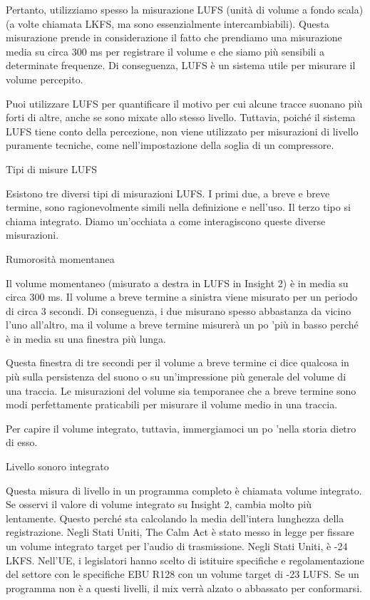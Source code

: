 Pertanto, utilizziamo spesso la misurazione LUFS (unità di volume a fondo scala)
(a volte chiamata LKFS, ma sono essenzialmente intercambiabili). Questa
misurazione prende in considerazione il fatto che prendiamo una misurazione media
su circa 300 ms per registrare il volume e che siamo più sensibili a determinate
frequenze. Di conseguenza, LUFS è un sistema utile per misurare il volume percepito.

Puoi utilizzare LUFS per quantificare il motivo per cui alcune tracce suonano
più forti di altre, anche se sono mixate allo stesso livello. Tuttavia, poiché
il sistema LUFS tiene conto della percezione, non viene utilizzato per misurazioni
di livello puramente tecniche, come nell'impostazione della soglia di un compressore.

Tipi di misure LUFS

Esistono tre diversi tipi di misurazioni LUFS. I primi due, a breve e breve
termine, sono ragionevolmente simili nella definizione e nell'uso. Il terzo
tipo si chiama integrato. Diamo un'occhiata a come interagiscono queste diverse
misurazioni.

Rumorosità momentanea

Il volume momentaneo (misurato a destra in LUFS in Insight 2) è in media su
circa 300 ms. Il volume a breve termine a sinistra viene misurato per un periodo di
circa 3 secondi. Di conseguenza, i due misurano spesso abbastanza da vicino
l'uno all'altro, ma il volume a breve termine misurerà un po 'più in basso
perché è in media su una finestra più lunga.

Questa finestra di tre secondi per il volume a breve termine ci dice qualcosa in
più sulla persistenza del suono o su un'impressione più generale del volume di
una traccia. Le misurazioni del volume sia temporanee che a breve termine sono
modi perfettamente praticabili per misurare il volume medio in una traccia.

Per capire il volume integrato, tuttavia, immergiamoci un po 'nella storia dietro di esso.

Livello sonoro integrato

Questa misura di livello in un programma completo è chiamata volume integrato.
Se osservi il valore di volume integrato su Insight 2, cambia molto più lentamente.
Questo perché sta calcolando la media dell'intera lunghezza della registrazione.
Negli Stati Uniti, The Calm Act è stato messo in legge per fissare un volume
integrato target per l'audio di trasmissione. Negli Stati Uniti, è -24 LKFS.
Nell'UE, i legislatori hanno scelto di istituire specifiche e regolamentazione
del settore con le specifiche EBU R128 con un volume target di -23 LUFS.
Se un programma non è a questi livelli, il mix verrà alzato o abbassato per
conformarsi.


